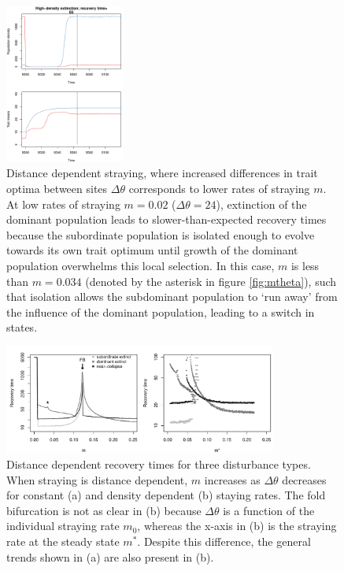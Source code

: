\documentclass[twocolumn,preprintnumbers,amsmath,amssymb,superscriptaddress]{revtex4}
\begin{document}
\begin{figure}
  \captionsetup{justification=raggedright,
singlelinecheck=false
}
\centering
\includegraphics[width=0.35\textwidth]{figs2/fig_relax_inertia.pdf}
\caption{
Distance dependent straying, where increased differences in trait optima between sites $\Delta\theta$ corresponds to lower rates of straying $m$.
At low rates of straying $m=0.02$ ($\Delta\theta=24$), extinction of the dominant population leads to slower-than-expected recovery times because the subordinate population is isolated enough to evolve towards its own trait optimum until growth of the dominant population overwhelms this local selection.
In this case, $m$ is less than $m=0.034$ (denoted by the asterisk in figure \ref{fig:mtheta}), such that isolation allows the subdominant population to `run away' from the influence of the dominant population, leading to a switch in states.
} \label{fig:inertia}
\end{figure}

\begin{figure}
  \captionsetup{justification=raggedright,
singlelinecheck=false
}
  \centering
  \includegraphics[width=0.8\textwidth]{figs2/fig_relax_mtheta.pdf}
  \caption{
  Distance dependent recovery times for three disturbance types. When straying is distance dependent, $m$ increases as $\Delta\theta$ decreases for constant (a) and density dependent (b) staying rates.
  The fold bifurcation is not as clear in (b) because $\Delta\theta$ is a function of the individual straying rate $m_0$, whereas the x-axis in (b) is the straying rate at the steady state $m^*$.
  Despite this difference, the general trends shown in (a) are also present in (b).
  } \label{fig:mthetamvm}
\end{figure}
\end{document}
